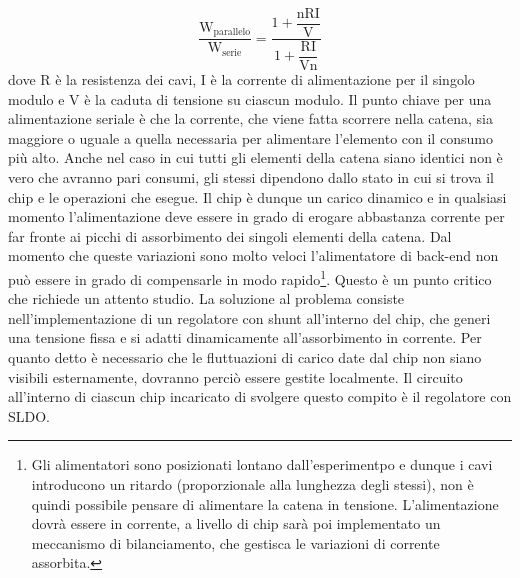 \begin{equation}
\mathrm{\frac{W_{parallelo}}{W_{serie}} = \frac{1+ \dfrac{nRI}{V}}{1+\dfrac{RI}{Vn}}}
\end{equation}
dove R è la resistenza dei cavi, I è la corrente di alimentazione per il singolo modulo e V è la caduta di tensione su ciascun modulo. 
Il punto chiave per una alimentazione seriale è che la corrente, che viene fatta scorrere nella catena, sia maggiore o uguale a quella necessaria per alimentare l'elemento con il consumo più alto. 
Anche nel caso in cui tutti gli elementi della catena siano identici non è vero che avranno pari consumi, gli stessi dipendono dallo stato in cui si trova il chip e le operazioni che esegue. 
Il chip è dunque un carico dinamico e in qualsiasi momento l'alimentazione deve essere in grado di erogare abbastanza corrente per far fronte ai picchi di assorbimento dei singoli elementi della catena. 
Dal momento che queste variazioni sono molto veloci l'alimentatore di back-end non può essere in grado di compensarle in modo rapido\footnote{Gli alimentatori sono posizionati lontano dall'esperimentpo e dunque i cavi introducono un ritardo (proporzionale alla lunghezza degli stessi), non è quindi possibile pensare di alimentare la catena in tensione. L'alimentazione dovrà essere in corrente, a livello di chip sarà poi implementato un meccanismo di bilanciamento, che gestisca le variazioni di corrente assorbita.}. Questo è un punto critico che richiede un attento studio. 
La soluzione al problema consiste nell'implementazione di un regolatore con shunt all'interno del chip, che generi una tensione fissa e si adatti dinamicamente all'assorbimento in corrente. 
Per quanto detto è necessario che le fluttuazioni di carico date dal chip non siano visibili esternamente, dovranno perciò essere gestite localmente. Il circuito all'interno di ciascun chip incaricato di svolgere questo compito è il regolatore con SLDO.

